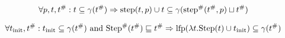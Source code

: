 \documentclass{article}
\begin{document}
\begin{lem}
	\[\forall p,t,{t}^{\#}:t\subseteq\gamma({t}^{\#})\Rightarrow\text{step}(t,p)\cup t\subseteq\gamma({\text{step}}^{\#}({t}^{\#},p)\sqcup{t}^{\#})\]
\end{lem}
\begin{lem}
	\[\forall t_{\text{init}},{t}^{\#}:t_{\text{init}}\subseteq\gamma({t}^{\#})\text{ and }{\text{Step}}^{\#}({t}^{\#})\sqsubseteq{t}^{\#}\Rightarrow\text{lfp}(\lambda t.\text{Step}(t)\cup t_{\text{init}})\subseteq\gamma({t}^{\#})\]
\end{lem}
\end{document}
